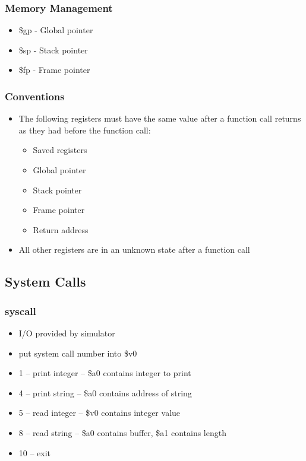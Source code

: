 \documentclass[usepdftitle=false,professionalfonts,compress ]{beamer}
\begin{document}
{
\begin{frame}\frametitle{Memory Management}

	\begin{itemize}
	\item \$gp - Global pointer
			\item \$sp - Stack pointer
			\item \$fp - Frame pointer
				\end{itemize}

\end{frame}}





{
\begin{frame}\frametitle{Conventions}

	\begin{itemize}
	\item The following registers must have the same value after a function call returns as they had before the function call:

	\begin{itemize}
	\item Saved registers
			\item Global pointer
			\item Stack pointer
			\item Frame pointer
			\item Return address
				\end{itemize}

			\item All other registers are in an unknown state after a function call
				\end{itemize}

\end{frame}}




\subsection{System Calls}

{
\begin{frame}\frametitle{syscall}

	\begin{itemize}
	\item I/O provided by simulator
			\item put system call number into \$v0
			\item 1 -- print integer -- \$a0 contains integer to print
			\item 4 -- print string -- \$a0 contains address of string
			\item 5 -- read integer -- \$v0 contains integer value
			\item 8 -- read string -- \$a0 contains buffer, \$a1 contains length
			\item 10 -- exit
				\end{itemize}

\end{frame}}
\end{document}
